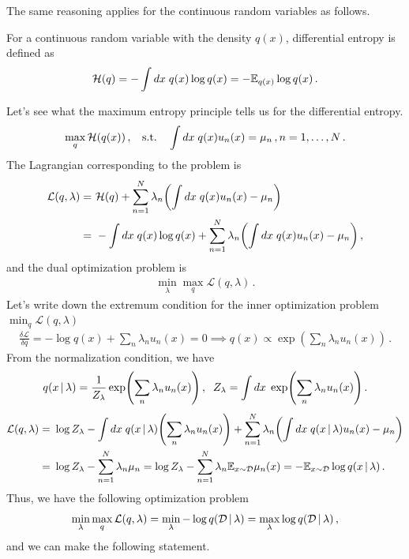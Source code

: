 The same reasoning applies for the continuous random variables as follows.
\begin{mybox}
\begin{definition}\label{def:diff_entropy}
    For a continuous random variable with the density $q(x)$, differential entropy is defined as
    \begin{align}
        \mathcal{H}(q) = -\int dx\; q(x) \log q(x) = -\mathbb{E}_{q(x)}\log q(x)\,.
    \end{align}
\end{definition}    
\end{mybox}
Let's see what the maximum entropy principle tells us for the differential entropy.
\begin{align}
    \max_{q} \mathcal{H}(q(x))\,, \;\; \text{ s.t. }\;\; \int dx\; q(x)u_n(x) = \mu_n\,, n = 1,\ldots,N\,.
\end{align}
The Lagrangian corresponding to the problem is
\begin{align}
    \mathcal{L}(q,\lambda) =~& \ent(q) + \sum_{n=1}^N\lambda_n \left(\int dx\; q(x)u_n(x) - \mu_n\right) \\
    =~& -\int dx\;q(x)\log q(x) + \sum_{n=1}^N\lambda_n \left(\int dx\; q(x)u_n(x) - \mu_n\right)\,,
\end{align}
and the dual optimization problem is
\begin{align}
    \min_\lambda \max_q \mathcal{L}(q,\lambda)\,.
\end{align}
Let's write down the extremum condition for the inner optimization problem $\min_q \mathcal{L}(q,\lambda)$
\begin{align}
    \frac{\delta \mathcal{L}}{\delta q} = -\log q(x) + \sum_n\lambda_n u_n(x) = 0 \implies q(x) \propto \exp\left(\sum_n\lambda_n u_n(x)\right)\,.
\end{align}
From the normalization condition, we have
\begin{align}
    q(x\cond \lambda) = \frac{1}{Z_\lambda}\exp\left(\sum_n\lambda_n u_n(x)\right)\,,\;\; Z_\lambda = \int dx\; \exp\left(\sum_n\lambda_n u_n(x)\right)\,.
\end{align}
\begin{align}
    \mathcal{L}(q,\lambda) =~& \log Z_\lambda - \int dx\;q(x\cond \lambda)\left(\sum_n\lambda_n u_n(x)\right) + \sum_{n=1}^N\lambda_n \left(\int dx\; q(x\cond \lambda)u_n(x) - \mu_n\right) \\
    =~& \log Z_\lambda -\sum_{n=1}^N\lambda_n\mu_n = \log Z_\lambda -\sum_{n=1}^N\lambda_n\mean_{x \sim \mathcal{D}}\mu_n(x) = -\mean_{x \sim \mathcal{D}}\log q(x\cond \lambda)\,.
\end{align}
Thus, we have the following optimization problem
\begin{align}
    \min_\lambda \max_q \mathcal{L}(q,\lambda) = \min_\lambda - \log q(\mathcal{D}\,|\, \lambda) = \max_\lambda \log q(\mathcal{D}\,|\, \lambda)\,,
\end{align}
and we can make the following statement.

